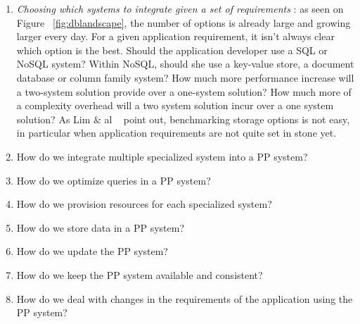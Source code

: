 \begin{enumerate}
\item{\emph{Choosing which systems to integrate given a set of requirements} : as seen on Figure ~\ref{fig:dblandscape}, the number of options is already large and growing larger every day. For a given application requirement, it isn't always clear which option is the best. Should the application developer use a SQL or NoSQL system? Within NoSQL, should she use a key-value store, a document database or column family system? How much more performance increase will a two-system solution provide over a one-system solution? How much more of a complexity overhead will a two system solution incur over a one system solution? As Lim \& al ~\cite{Lim2013}  point out, benchmarking storage options is not easy, in particular when application requirements are not quite set in stone yet.}
\item{How do we integrate multiple specialized system into a PP system?}
\item{How do we optimize queries in a PP system?}
\item{How do we provision resources for each specialized system?}
\item{How do we store data in a PP system?}
\item{How do we update the PP system?}
\item{How do we keep the PP system available and consistent?}
\item{How do we deal with changes in the requirements of the application using the PP system?}
\end{enumerate}
